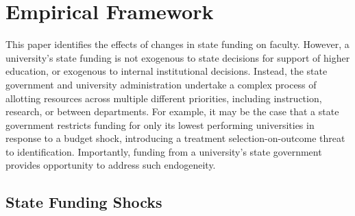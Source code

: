 \section{Empirical Framework}
\label{sec:empirics}

This paper identifies the effects of changes in state funding on faculty.
However, a university's state funding is not exogenous to state decisions for support of higher education, or exogenous to internal institutional decisions.
Instead, the state government and university administration undertake a complex process of allotting resources across multiple different priorities, including instruction, research, or between departments.
For example, it may be the case that a state government restricts funding for only its lowest performing universities in response to a budget shock, introducing a treatment selection-on-outcome threat to identification. 
Importantly, funding from a university's state government provides opportunity to address such endogeneity.

\subsection{State Funding Shocks}
\label{sec:approp-shocks}

